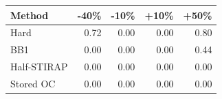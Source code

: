 \begin{tabular}{lrrrr}
\toprule
Method & -40\% & -10\% & +10\% & +50\% \\
\midrule
Hard & 0.72 & 0.00 & 0.00 & 0.80 \\
BB1 & 0.00 & 0.00 & 0.00 & 0.44 \\
Half-STIRAP & 0.00 & 0.00 & 0.00 & 0.00 \\
Stored OC & 0.00 & 0.00 & 0.00 & 0.00 \\
\bottomrule
\end{tabular}